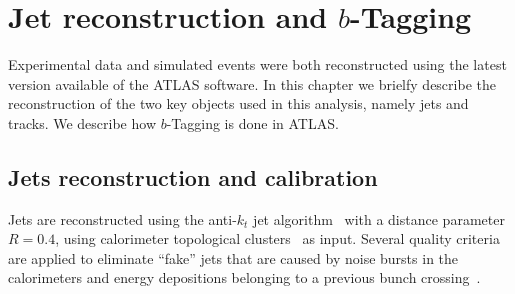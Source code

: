 %
%

\chapter{Jet reconstruction and $b$-Tagging }\label{sec:reconstruction}


Experimental data and simulated events were both reconstructed using the latest version available of the ATLAS software. In this chapter we brielfy describe the reconstruction of the two key objects used in this analysis, namely jets and tracks.
We describe how $b$-Tagging is done in ATLAS.


\section{Jets reconstruction and calibration}\label{sec:ObjSelection}


Jets are reconstructed using the anti-$k_t$ jet algorithm~\cite{antiktalg} with a distance parameter $R = 0.4$, using calorimeter topological clusters~\cite{topoClusters} as input.  %
Several quality criteria are applied to eliminate ``fake'' jets that are %
caused by noise bursts in the calorimeters and energy depositions belonging to a previous bunch crossing~\cite{ATLAS-CONF-2012-020}.


